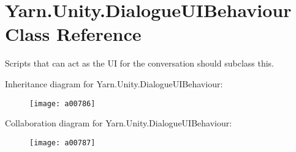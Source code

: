 \hypertarget{a00095}{\section{Yarn.\-Unity.\-Dialogue\-U\-I\-Behaviour Class Reference}
\label{a00095}
}


Scripts that can act as the U\-I for the conversation should subclass this.  




Inheritance diagram for Yarn.\-Unity.\-Dialogue\-U\-I\-Behaviour\-:
\nopagebreak
\begin{figure}[H]
\begin{center}
\leavevmode
\texttt{[image: a00786]}
\end{center}
\end{figure}


Collaboration diagram for Yarn.\-Unity.\-Dialogue\-U\-I\-Behaviour\-:
\nopagebreak
\begin{figure}[H]
\begin{center}
\leavevmode
\texttt{[image: a00787]}
\end{center}
\end{figure}
